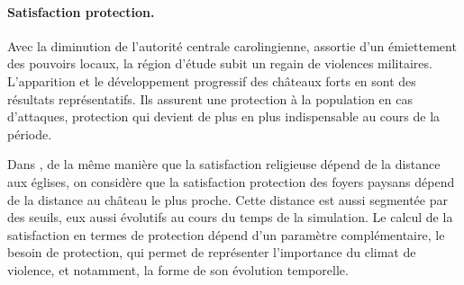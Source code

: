 \paragraph{Satisfaction \og protection\fg{}.} 
Avec la diminution de l'autorité centrale carolingienne, assortie d'un émiettement des pouvoirs locaux, la région d'étude subit un regain de violences militaires.
L'apparition et le développement progressif des châteaux forts en sont des résultats représentatifs.
Ils assurent une protection à la population en cas d'attaques, protection qui devient de plus en plus indispensable au cours de la période.

\begin{tcolorbox}[breakable,left=0pt,right=0pt,top=0pt,bottom=0pt,
	colback=gray!15,colframe=gray!15,width=\dimexpr\textwidth\relax, 
	enlarge left by=0mm, boxsep=5pt,arc=0pt,outer arc=0pt]
	Dans \simfeodal{}, de la même manière que la satisfaction religieuse dépend de la distance aux églises, on considère que la satisfaction \og protection\fg{} des foyers paysans dépend de la distance au château le plus proche.
	Cette distance est aussi segmentée par des seuils, eux aussi évolutifs au cours du temps de la simulation.
	Le calcul de la satisfaction en termes de protection dépend d'un paramètre complémentaire, le \og besoin de protection\fg{}, qui permet de représenter l'importance du climat de violence, et notamment, la forme de son évolution temporelle.
\end{tcolorbox}

